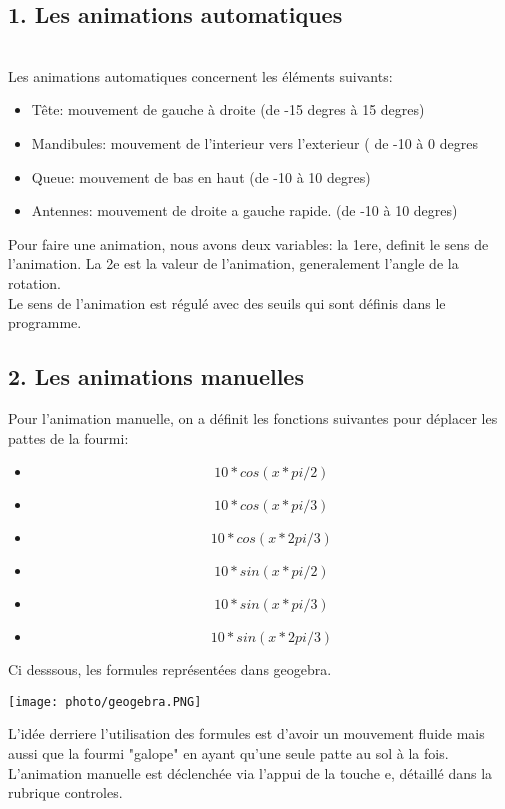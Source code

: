 \documentclass[11pt]{article}
\begin{document}
     \subsection*{1. Les animations automatiques}
     \\
     Les animations automatiques concernent les éléments suivants:
     \begin{itemize}
         \item Tête: mouvement de gauche à droite (de -15 degres à 15 degres)
         \item Mandibules: mouvement de l'interieur vers l'exterieur ( de -10 à 0 degres
         \item Queue: mouvement de bas en haut (de -10 à 10 degres)
         \item Antennes: mouvement de droite a gauche rapide. (de -10 à 10 degres)
     \end{itemize}
     
     \vspace{\baselineskip}
      Pour faire une animation, nous avons deux variables: la 1ere, definit le sens de l'animation. La 2e est la valeur de l'animation, generalement l'angle de la rotation.
      \\
      Le sens de l'animation est régulé avec des seuils qui sont définis dans le programme.
    
     \vspace{\baselineskip}
     
      \subsection*{2. Les animations manuelles}
      
        Pour l'animation manuelle, on a définit les fonctions suivantes pour déplacer les pattes de la fourmi:
        \begin{itemize}
            \item \[10 * cos(x * pi/2)\]
            \item \[10 * cos(x * pi/3)\]
            \item \[10 * cos(x * 2pi/3)\]
            \item \[10 * sin(x * pi/2)\]
            \item \[10 * sin(x * pi/3)\]
            \item \[10 * sin(x * 2pi/3)\]
        \end{itemize}
        Ci desssous, les formules représentées dans geogebra.
        \begin{center}
        \texttt{[image: photo/geogebra.PNG]}
        \end{center}
        L'idée derriere l'utilisation des formules est d'avoir un mouvement fluide mais aussi que la fourmi "galope" en ayant qu'une seule patte au sol à la fois.
        L'animation manuelle est déclenchée via l'appui de la touche e, détaillé dans la rubrique controles.
\newpage
\fancyhf{}
\end{document}
